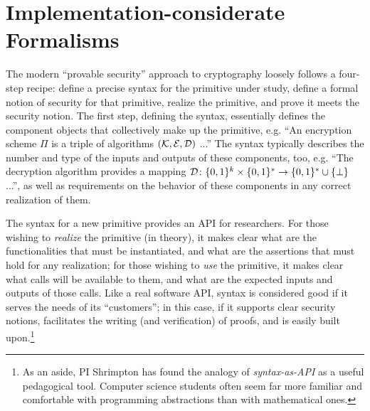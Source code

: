\section{Implementation-considerate Formalisms}
\label{sec:formalisms}
The modern ``provable security'' approach to cryptography loosely follows a
four-step recipe: define a precise syntax for the primitive under study, define
a formal notion of security for that primitive, realize the primitive,
and prove it meets the security notion. The first step, defining the syntax,
essentially defines the component objects that collectively make up the
primitive, e.g. ``An encryption scheme $\Pi$ is a triple of algorithms
$(\mathcal{K},\mathcal{E},\mathcal{D})$ ...''  The syntax typically describes the number and type
of the inputs and outputs of these components, too, e.g. ``The decryption
algorithm provides a mapping $\mathcal{D}\colon\{0,1\}^{k}\times\{0,1\}^* \to \{0,1\}^* \cup
\{\bot\}$ ...'', as well as requirements on the behavior of these components in
any correct realization of them.

%
The syntax for a new primitive provides an API for researchers. For
those wishing to \emph{realize} the primitive (in theory), it makes clear what
are the functionalities that must be instantiated, and what are the assertions that
must hold for any realization; for those wishing to \emph{use} the primitive, it
makes clear what calls will be available to them, and what are the expected
inputs and outputs of those calls.
%
Like a real software API, syntax is considered good if it serves the needs of
its ``customers''; in this case, if it supports clear security notions,
facilitates the writing (and verification) of proofs, and is easily built
upon.\footnote{As an aside, PI Shrimpton has found the analogy of
\emph{syntax-as-API} as a useful pedagogical tool. Computer science students
often seem far more familiar and comfortable with programming abstractions than
with mathematical ones.}


